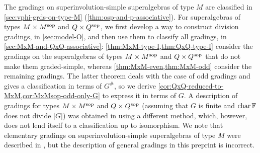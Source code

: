 The gradings on superinvolution-simple superalgebras of type $M$ are classified in \cref{sec:vphi-grds-on-type-M} (\cref{thm:osp-and-p-associative}). 
For superalgebras of types $M\times M^{\mathrm{sop}}$ and $Q\times Q^{\mathrm{sop}}$, we first develop a way to construct division gradings, in \cref{sec:model-O}, and then use them to classify all gradings, in \cref{sec:MxM-and-QxQ-associative}: 
\cref{thm:MxM-type-I,thm:QxQ-type-I} consider the gradings on the superalgebras of types $M\times M^{\mathrm{sop}}$ and $Q\times Q^{\mathrm{sop}}$ that do not make them graded-simple, whereas  
\cref{thm:MxM-even,thm:MxM-odd} consider the remaining gradings. 
The latter theorem deals with the case of odd gradings and gives a classification in terms of $G^\#$, so we derive
\cref{cor:QxQ-reduced-to-MxM,cor:MxMsop-odd-only-G} to express it in terms of $G$. 
A description of gradings for types $M\times M^{\mathrm{sop}}$ and $Q\times Q^{\mathrm{sop}}$ (assuming that $G$ is finite and $\operatorname{char} \mathbb{F}$ does not divide $|G|$) was obtained in \cite[Theorems 4 and 5]{BTT} using a different method, which, however, does not lend itself to a classification up to isomorphism. 
We note that elementary gradings on superinvolution-simple superalgebras of type $M$ were described in \cite[Theorems 5.2 and 5.3]{TT}, but the description of general gradings in this preprint is incorrect.  















